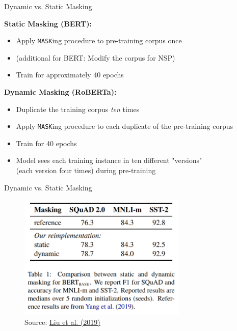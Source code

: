\begin{frame}{Dynamic vs. Static Masking}

\vfill

	\textbf{Static Masking (BERT):}

	\begin{itemize}
		\item Apply \texttt{MASK}ing procedure to pre-training corpus once
		\item (additional for BERT: Modify the corpus for NSP)
		\item Train for approximately 40 epochs
	\end{itemize}

\vspace{.3cm}

	\textbf{Dynamic Masking (RoBERTa):}

	\begin{itemize}
		\item Duplicate the training corpus \textit{ten} times
		\item Apply \texttt{MASK}ing procedure to each duplicate of the pre-training corpus
		\item Train for 40 epochs
		\item Model sees each training instance in ten different "versions"\\
					(each version four times) during pre-training
	\end{itemize}
	
\vfill

\end{frame}


\begin{frame}{Dynamic vs. Static Masking}

\vfill

\begin{figure}
\centering
\includegraphics[width = 8cm]{figure/roberta-dynamic.png}\\ 
\footnotesize{Source:} \href{https://arxiv.org/pdf/1907.11692.pdf}{\footnotesize Liu et al. (2019)}
\end{figure}

\vfill

\end{frame}

